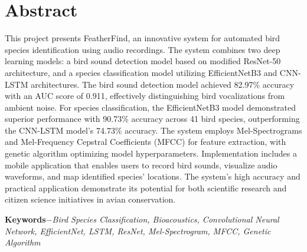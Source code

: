 \chapter*{Abstract}
This project presents FeatherFind, an innovative system for automated bird species identification using audio recordings. The system combines two deep learning models: a bird sound detection model based on modified ResNet-50 architecture, and a species classification model utilizing EfficientNetB3 and CNN-LSTM architectures. The bird sound detection model achieved 82.97\% accuracy with an AUC score of 0.911, effectively distinguishing bird vocalizations from ambient noise. For species classification, the EfficientNetB3 model demonstrated superior performance with 90.73\% accuracy across 41 bird species, outperforming the CNN-LSTM model's 74.73\% accuracy. The system employs Mel-Spectrograms and Mel-Frequency Cepstral Coefficients (MFCC) for feature extraction, with genetic algorithm optimizing model hyperparameters. Implementation includes a mobile application that enables users to record bird sounds, visualize audio waveforms, and map identified species' locations. The system's high accuracy and practical application demonstrate its potential for both scientific research and citizen science initiatives in avian conservation.

{\textbf{Keywords}}{\textit{$-$Bird Species Classification, Bioacoustics, Convolutional Neural Network, EfficientNet, LSTM, ResNet, Mel-Spectrogram, MFCC, Genetic Algorithm}}




{

    \KECadjusttocspacings %
    \makeatletter
    \def\@makeschapterhead#1{%
        {\newpage \parindent\z@ \raggedright\normalfont
                \interlinepenalty\@M
                \center\fontsize{16pt}{1} \bfseries
                \MakeUppercase{#1}\par\nobreak
                \vskip 18\p@ %
            }}
    \makeatother

    \tableofcontents %
    \listoffigures %
    \listoftables %

}

